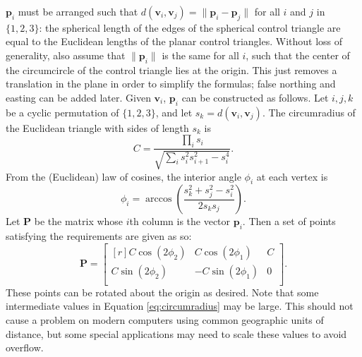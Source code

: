 \documentclass[]{interact}
\begin{document}
$\mathbf p_i$ must be arranged such that
$d\left(\mathbf v_i, \mathbf v_j\right) = \|\mathbf p_i - \mathbf p_j\|$
for all $i$ and $j$ in $\{1, 2, 3\}$: the spherical length of the edges of the
spherical control triangle are equal to the Euclidean lengths of the planar
control triangles. Without loss of generality, also assume that
$\|\mathbf p_i\|$ is the same for all $i$, such that the center of the
circumcircle of the control triangle lies at the origin. This just removes a
translation in the plane in order to simplify the formulas; false northing and
easting can be added later. Given $\mathbf v_i$, $\mathbf p_i$ can be
constructed as follows. Let $i, j, k$ be a cyclic permutation of $\{1, 2, 3\}$,
and let $s_k = d\left(\mathbf v_i, \mathbf v_j\right)$. The circumradius of the Euclidean
triangle with sides of length $s_k$ is \citep{isaacs}
\begin{equation}\label{eq:circumradius}
  C = \frac{\prod_i s_i}{\sqrt{\sum_i s_i^2 s_{i+1}^2 - s_i^4}}.
\end{equation}
From the (Euclidean) law of cosines,
the interior angle $\phi_i$ at each vertex is
\begin{equation}\label{eq:phi}
  \phi_i = \arccos \left( \frac{s_k^2 + s_j^2 - s_i^2}{2 s_k s_j}\right).
\end{equation}
Let $\mathbf P$ be the matrix whose $i$th column is the vector $\mathbf p_i$. Then a
set of points satisfying the requirements are given as so:
\begin{equation}\label{eq:planarctrlpts}
  \mathbf P = \begin{bmatrix*}[r]
  C \cos \left(2 \phi_2 \right) &
  C \cos \left(2 \phi_1 \right) &
  C \\
  C \sin \left(2 \phi_2 \right) &
  -C \sin \left(2 \phi_1 \right) &
  0 \\
\end{bmatrix*}.
\end{equation}
These points can be rotated about the origin as desired. Note that some
intermediate values in Equation \ref{eq:circumradius} may be large. This should
not cause a problem on modern computers using common geographic units of
distance, but some special applications may need to scale these values to avoid
overflow.
\end{document}
